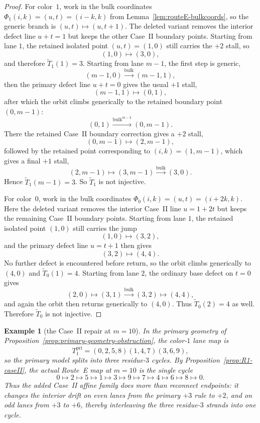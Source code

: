 \documentclass[11pt]{article}
\newtheorem{example}{Example}
\newcommand{\bulk}{\mathrm{bulk}}   %
\begin{document}
\begin{proof}
For color~$1$, work in the bulk coordinates $\Phi_1(i,k)=(u,t)=(i-k,k)$ from Lemma~\ref{lem:routeE-bulkcoords}, so the generic branch is $(u,t)\mapsto(u,t+1)$.
The deleted variant removes the interior defect line $u+t=1$ but keeps the other Case~II boundary points.
Starting from lane $1$, the retained isolated point $(u,t)=(1,0)$ still carries the $+2$ stall, so
\[
(1,0)\longmapsto(3,0),
\]
and therefore $\widetilde T_1(1)=3$.
Starting from lane $m-1$, the first step is generic,
\[
(m-1,0)\xrightarrow{\bulk}(m-1,1),
\]
then the primary defect line $u+t=0$ gives the usual $+1$ stall,
\[
(m-1,1)\longmapsto(0,1),
\]
after which the orbit climbs generically to the retained boundary point $(0,m-1)$:
\[
(0,1)\xrightarrow{\bulk^{m-2}}(0,m-1).
\]
There the retained Case~II boundary correction gives a $+2$ stall,
\[
(0,m-1)\longmapsto(2,m-1),
\]
followed by the retained point corresponding to $(i,k)=(1,m-1)$, which gives a final $+1$ stall,
\[
(2,m-1)\longmapsto(3,m-1)\xrightarrow{\bulk}(3,0).
\]
Hence $\widetilde T_1(m-1)=3$.
So $\widetilde T_1$ is not injective.

For color~$0$, work in the bulk coordinates $\Phi_0(i,k)=(u,t)=(i+2k,k)$.
Here the deleted variant removes the interior Case~II line $u=1+2t$ but keeps the remaining Case~II boundary points.
Starting from lane $1$, the retained isolated point $(1,0)$ still carries the jump
\[
(1,0)\longmapsto(3,2),
\]
and the primary defect line $u=t+1$ then gives
\[
(3,2)\longmapsto(4,4).
\]
No further defect is encountered before return, so the orbit climbs generically to $(4,0)$ and $\widetilde T_0(1)=4$.
Starting from lane $2$, the ordinary base defect on $t=0$ gives
\[
(2,0)\longmapsto(3,1)\xrightarrow{\bulk}(3,2)\longmapsto(4,4),
\]
and again the orbit then returns generically to $(4,0)$.
Thus $\widetilde T_0(2)=4$ as well.
Therefore $\widetilde T_0$ is not injective.
\end{proof}

\begin{example}[the Case~II repair at $m=10$]\label{ex:m10-color1}
In the primary geometry of Proposition~\ref{prop:primary-geometry-obstruction}, the color-$1$ lane map is
\[
T_1^{\mathrm{pri}}=(0,2,5,8)(1,4,7)(3,6,9),
\]
so the primary model splits into three residue-$3$ cycles.
By Proposition~\ref{prop:R1-caseII}, the actual Route~E map at $m=10$ is the single cycle
\[
0\mapsto 2\mapsto 5\mapsto 1\mapsto 3\mapsto 9\mapsto 7\mapsto 4\mapsto 6\mapsto 8\mapsto 0.
\]
Thus the added Case~II affine family does more than reconnect endpoints: it changes the interior drift on even lanes from the primary $+3$ rule to $+2$, and on odd lanes from $+3$ to $+6$, thereby interleaving the three residue-$3$ strands into one cycle.
\end{example}
\end{document}
